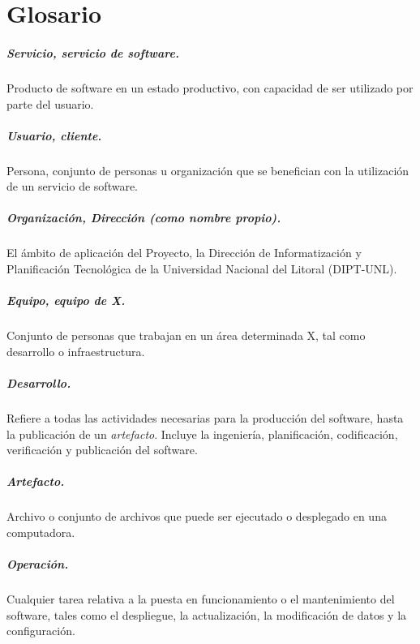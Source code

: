 \chapter{Glosario}

\paragraph{Servicio, servicio de software.} Producto de software en un
estado productivo, con capacidad de ser utilizado por parte del
usuario.

\paragraph{Usuario, cliente.} Persona, conjunto de personas u
organización que se benefician con la utilización de un servicio de
software.

\paragraph{Organización, Dirección (como nombre propio).} El ámbito de
aplicación del Proyecto, la Dirección de Informatización y
Planificación Tecnológica de la Universidad Nacional del Litoral
(DIPT-UNL).

\paragraph{Equipo, equipo de X.} Conjunto de personas que trabajan en un
área determinada X, tal como desarrollo o infraestructura.

\paragraph{Desarrollo.} Refiere a todas las actividades necesarias para
la producción del software, hasta la publicación de un
\textit{artefacto}. Incluye la ingeniería, planificación,
codificación, verificación y publicación del software.

\paragraph{Artefacto.} Archivo o conjunto de archivos que puede ser
ejecutado o desplegado en una computadora.

\paragraph{Operación.} Cualquier tarea relativa a la puesta en
funcionamiento o el mantenimiento del software, tales como el
despliegue, la actualización, la modificación de datos y la
configuración.

